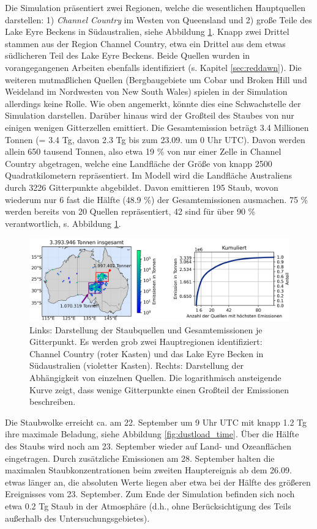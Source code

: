 \documentclass[12pt,a4paper,onecolumn]{scrartcl}
\begin{document}
Die Simulation präsentiert zwei Regionen, welche die wesentlichen Hauptquellen darstellen: 1) \textit{Channel Country} im Westen von Queensland und 2) große Teile des Lake Eyre Beckens in Südaustralien, siehe Abbildung \ref{fig:emissions}. Knapp zwei Drittel stammen aus der Region Channel Country, etwa ein Drittel aus dem etwas südlicheren Teil des Lake Eyre Beckens. Beide Quellen wurden in vorangegangenen Arbeiten ebenfalls identifiziert (s. Kapitel \ref{sec:reddawn}). Die weiteren mutmaßlichen Quellen (Bergbaugebiete um Cobar und Broken Hill und Weideland im Nordwesten von New South Wales) spielen in der Simulation allerdings  keine Rolle. Wie oben angemerkt, könnte dies eine Schwachstelle der Simulation darstellen. Darüber hinaus wird der Großteil des Staubes von nur einigen wenigen Gitterzellen emittiert. Die Gesamtemission beträgt 3.4 Millionen Tonnen (= 3.4 Tg, davon 2.3 Tg bis zum 23.09. um 0 Uhr UTC). Davon werden allein 650 tausend Tonnen, also etwa 19 \% von nur einer Zelle in Channel Country abgetragen, welche eine Landfläche der Größe von knapp 2500 Quadratkilometern repräsentiert. Im Modell wird die Landfläche Australiens durch 3226 Gitterpunkte abgebildet. Davon emittieren 195 Staub, wovon wiederum nur 6 fast die Hälfte (48.9 \%) der Gesamtemissionen ausmachen. 75 \% werden bereits von 20 Quellen repräsentiert, 42 sind für über 90 \% verantwortlich, s. Abbildung \ref{fig:emissions}. 
\begin{figure}[!htb]
\includegraphics[width=\textwidth]{bilder/emission_sections.png}
\caption{Links: Darstellung der Staubquellen und Gesamtemissionen je Gitterpunkt. Es werden grob zwei Hauptregionen identifiziert: Channel Country (roter Kasten) und das Lake Eyre Becken in Südaustralien (violetter Kasten). Rechts: Darstellung der Abhängigkeit von einzelnen Quellen. Die logarithmisch ansteigende Kurve zeigt, dass wenige Gitterpunkte einen Großteil der Emissionen beschreiben.} \label{fig:emissions}
\end{figure}
Die Staubwolke erreicht ca. am 22. September um 9 Uhr UTC mit knapp 1.2 Tg ihre maximale Beladung, siehe Abbildung \ref{fig:dustload_time}. Über die Hälfte des Staubs wird noch am 23. September wieder auf Land- und Ozeanflächen eingetragen. Durch zusätzliche Emissionen am 28. September halten die maximalen Staubkonzentrationen beim zweiten Hauptereignis ab dem 26.09. etwas länger an, die absoluten Werte liegen aber etwa bei der Hälfte des größeren Ereignisses vom 23. September. Zum Ende der Simulation befinden sich noch etwa 0.2 Tg Staub in der Atmosphäre (d.h., ohne Berücksichtigung des Teils außerhalb des Untersuchungsgebietes).
\end{document}

